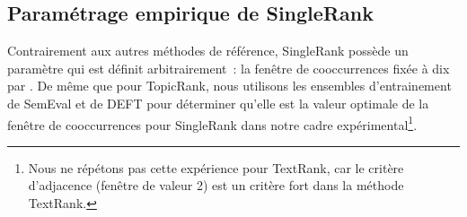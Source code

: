   \subsection{Paramétrage empirique de SingleRank}
  \label{subsec:parametrage_empirique_de_singlerank}
    Contrairement aux autres méthodes de référence, SingleRank possède un
    paramètre qui est définit arbitrairement~: la fenêtre de cooccurrences fixée
    à dix par . De même que pour TopicRank, nous
    utilisons les ensembles d'entrainement de SemEval et de DEFT pour déterminer
    qu'elle est la valeur optimale de la fenêtre de cooccurrences pour
    SingleRank dans notre cadre expérimental\footnote{Nous ne répétons pas cette
    expérience pour TextRank, car le critère d'adjacence (fenêtre de valeur 2)
    est un critère fort dans la méthode TextRank.}.

